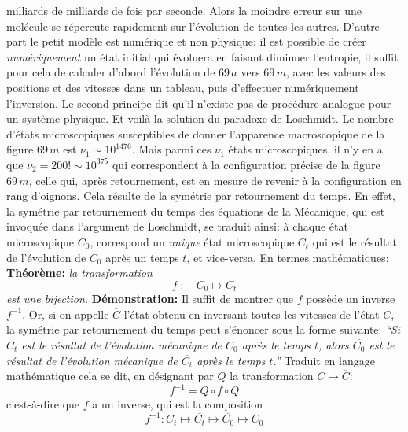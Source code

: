 milliards de milliards de fois par seconde. Alors la moindre erreur sur une 
mol\'ecule se r\'epercute rapidement sur l'\'evolution de toutes les autres.
D'autre part le petit mod\`ele est num\'erique et non physique: il est
possible de cr\'eer {\it num\'eriquement} un \'etat initial qui 
\'evoluera en faisant diminuer l'entropie, il suffit pour cela de calculer 
d'abord l'\'evolution de $69\, a$ vers $69\, m$, avec les valeurs des 
positions et des vitesses dans un tableau, puis d'effectuer num\'eriquement 
l'inversion. Le second principe dit qu'il n'existe pas de proc\'edure 
analogue pour un syst\`eme physique.
\medskip
Et voil\`a la solution du paradoxe de Loschmidt. Le nombre d'\'etats 
microscopiques susceptibles de donner l'apparence macroscopique de la figure 
$69\, m$ est $\nu_1 \sim 10^{1476}$.
Mais parmi ces $\nu_1$ \'etats microscopiques, il n'y en a que 
$\nu_2 = 200! \sim 10^{375}$ qui correspondent \`a la configuration 
pr\'ecise de la figure $69\, m$, celle qui, apr\`es retournement, est en 
mesure de revenir \`a la configuration en rang d'oignons. Cela 
r\'esulte de la sym\'etrie par retournement du temps.
\medskip
En effet, la sym\'etrie par retournement du temps des \'equations de la 
M\'ecanique, qui est invoqu\'ee dans l'argument de Loschmidt, se traduit 
ainsi: \`a chaque \'etat microscopique $C_0$, correspond un {\it unique} 
\'etat microscopique $C_t$ qui est le r\'esultat de l'\'evolution de $C_0$ 
apr\`es un temps $t$, et vice-versa. En termes math\'ematiques:  
\medskip
{\bf Th\'eor\`eme:} {\sl la transformation 
$$f\; : \quad C_0 \mapsto C_t$$
est une bijection.} 
\medskip
{\bf D\'emonstration:} Il suffit de montrer que $f$ poss\`ede un inverse 
$f^{-1}$. Or, si on appelle $\overline{C}$ 
l'\'etat obtenu en inversant toutes les vitesses de l'\'etat $C$, la 
sym\'etrie par retournement du temps peut s'\'enoncer sous la forme suivante: 
\smallskip
{\sl
``Si $C_t$ est le r\'esultat de l'\'evolution m\'ecanique de $C_0$ apr\`es 
le temps $t$, alors $\overline{C_0}$ est le r\'esultat de l'\'evolution 
m\'ecanique de $\overline{C_t}$ apr\`es le temps $t$.''}
\medskip
Traduit en langage math\'ematique cela se dit, en d\'esignant par $Q$ la
transformation $C \mapsto \overline{C}$:
$$f^{-1} = Q \circ f \circ Q$$
c'est-\`a-dire que $f$ a un inverse, qui est la composition 
$$f^{-1} : C_t \mapsto \overline{C_t} \mapsto \overline{C_0} \mapsto C_0$$


\bigskip

